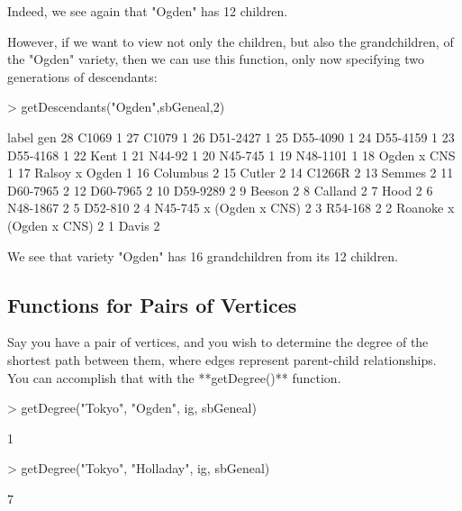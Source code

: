 \documentclass{article}
\numberwithin{equation}{section} %
\begin{document}
Indeed, we see again that "Ogden" has 12 children. 

However, if we want to view not only the children, but also the grandchildren, of the "Ogden" variety, then we can use this function, only now specifying two generations of descendants:

\begin{Schunk}
\begin{Sinput}
> getDescendants("Ogden",sbGeneal,2)
\end{Sinput}
\begin{Soutput}
                     label gen
28                   C1069   1
27                   C1079   1
26                D51-2427   1
25                D55-4090   1
24                D55-4159   1
23                D55-4168   1
22                    Kent   1
21                  N44-92   1
20                 N45-745   1
19                N48-1101   1
18             Ogden x CNS   1
17          Ralsoy x Ogden   1
16                Columbus   2
15                  Cutler   2
14                  C1266R   2
13                  Semmes   2
11                D60-7965   2
12                D60-7965   2
10                D59-9289   2
9                   Beeson   2
8                  Calland   2
7                     Hood   2
6                 N48-1867   2
5                  D52-810   2
4  N45-745 x (Ogden x CNS)   2
3                  R54-168   2
2  Roanoke x (Ogden x CNS)   2
1                    Davis   2
\end{Soutput}
\end{Schunk}

We see that variety "Ogden" has 16 grandchildren from its 12 children.

\subsection{Functions for Pairs of Vertices}

Say you have a pair of vertices, and you wish to determine the degree of the shortest path between them, where edges represent parent-child relationships. You can accomplish that with the **getDegree()** function.

\begin{Schunk}
\begin{Sinput}
> getDegree("Tokyo", "Ogden", ig, sbGeneal)
\end{Sinput}
\begin{Soutput}
[1] 1
\end{Soutput}
\begin{Sinput}
> getDegree("Tokyo", "Holladay", ig, sbGeneal)
\end{Sinput}
\begin{Soutput}
[1] 7
\end{Soutput}
\end{Schunk}
\end{document}
